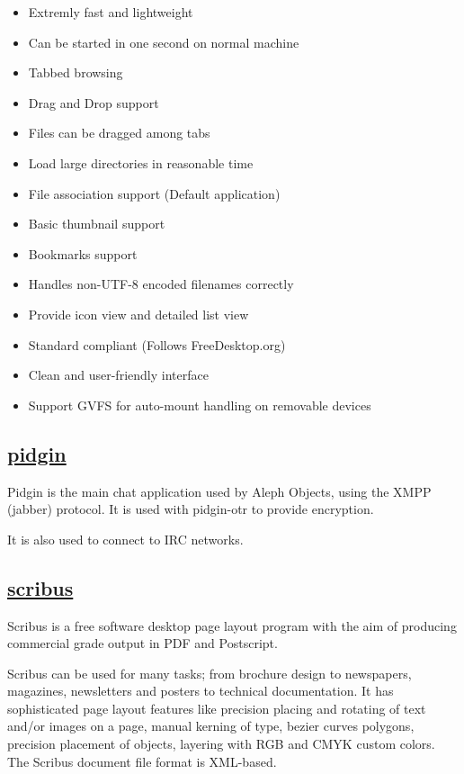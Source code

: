 \begin{itemize}
 \item Extremly fast and lightweight
 \item Can be started in one second on normal machine
 \item Tabbed browsing
 \item Drag and Drop support
 \item Files can be dragged among tabs
 \item Load large directories in reasonable time
 \item File association support (Default application)
 \item Basic thumbnail support
 \item Bookmarks support
 \item Handles non-UTF-8 encoded filenames correctly
 \item Provide icon view and detailed list view
 \item Standard compliant (Follows FreeDesktop.org)
 \item Clean and user-friendly interface
 \item Support GVFS for auto-mount handling on removable devices
\end{itemize}

\subsection{\href{http://www.pidgin.im}{pidgin}}

Pidgin is the main chat application used by Aleph Objects, using the XMPP
(jabber) protocol. It is used with pidgin-otr to provide encryption.

It is also used to connect to IRC networks.
 
\subsection{\href{http://www.scribus.net}{scribus}}

 Scribus is a free software desktop page layout program with the aim of
 producing commercial grade output in PDF and Postscript.
 
 Scribus can be used for many tasks; from brochure design to newspapers,
 magazines, newsletters and posters to technical documentation. It has
 sophisticated page layout features like precision placing and rotating of text
 and/or images on a page, manual kerning of type, bezier curves polygons,
 precision placement of objects, layering with RGB and CMYK custom colors. The
 Scribus document file format is XML-based.
 
